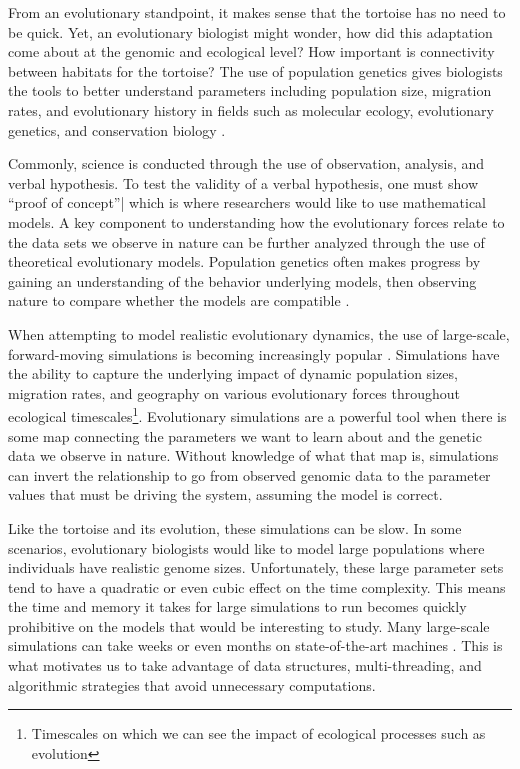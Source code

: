 \documentclass{article}
\begin{document}
From an evolutionary standpoint, it makes sense that the tortoise has no need to be quick.
Yet, an evolutionary biologist might wonder,
how did this adaptation come about at the genomic and ecological level? 
How important is connectivity between habitats for the tortoise?
The use of population genetics gives biologists the tools to better understand parameters including
population size, migration rates, and evolutionary history 
in fields such as molecular ecology, evolutionary genetics, and conservation biology \cite{Luikart2003}.

Commonly, science is conducted through the use of observation, analysis, and verbal hypothesis. 
To test the validity of a verbal hypothesis, one must show  ``proof of concept''|
which is where researchers would like to use mathematical models.
A key component to understanding how the evolutionary forces relate to the data sets we observe in nature
can be further analyzed through the use of theoretical evolutionary models. 
Population genetics often makes progress by gaining an understanding
of the behavior underlying models, then observing 
nature to compare whether the models are compatible \cite{gillespie2004}.

When attempting to model realistic evolutionary dynamics, 
the use of large-scale, forward-moving simulations is becoming increasingly popular \cite{Hoban}. 
Simulations have the ability to capture the underlying impact of dynamic population sizes, migration rates, and geography 
on various evolutionary forces throughout 
ecological timescales\footnote{Timescales on which we can see the impact of ecological processes such as evolution}.
Evolutionary simulations are a powerful tool when there is some map connecting the parameters we want to learn about
and the genetic data we observe in nature. 
Without knowledge of what that map is, simulations can invert the relationship
to go from observed genomic data to the parameter values that must be driving the system, assuming the model is correct. 

Like the tortoise and its evolution, these simulations can be slow. 
In some scenarios, evolutionary biologists would like to model large populations where individuals have realistic genome sizes.
Unfortunately, these large parameter sets tend to have a quadratic or even cubic effect on the time complexity.
This means the time and memory it takes for large simulations to run becomes quickly prohibitive on the models that would be interesting to study. 
Many large-scale simulations can take weeks or even months on state-of-the-art machines \cite{Ralph2018}.
This is what motivates us to take advantage of data structures, 
multi-threading, and algorithmic strategies that avoid unnecessary computations.
\end{document}

